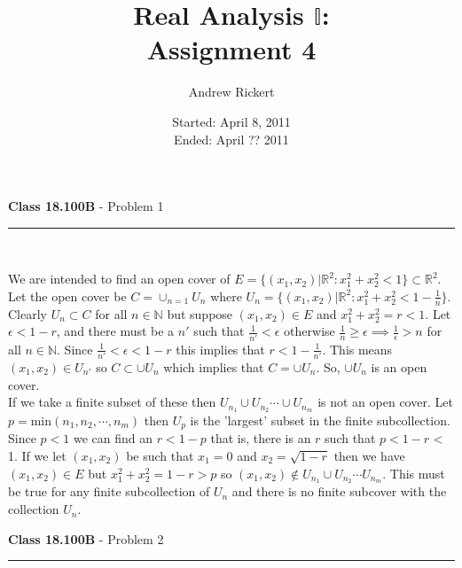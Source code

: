 \documentclass[11pt,reqno]{article}
\title{Real Analysis $\mathbb{I}$: \\ Assignment 4}
\author{Andrew Rickert}
\date{Started: April 8, 2011 \\ \hspace{1pt} Ended: April ??  2011}                                           %
\begin{document}
\maketitle


\begin{flushleft} 
\textbf{Class 18.100B} - Problem 1\\
\rule{500pt}{1pt}\\
\end{flushleft} 

We are intended to find an open cover of $E = \{(x_1,x_2) | \mathbb{R}^2 : x_1^2 + x_2^2 < 1\} \subset \mathbb{R}^2$. Let the open cover be $C = \cup_{n = 1} U_n$ where $U_n = \{ (x_1,x_2) | \mathbb{R}^2 : x_1^2 + x_2^2 < 1-\frac{1}{n} \}$. Clearly $U_n \subset C$ for all $n \in \mathbb{N}$ but suppose $(x_1,x_2) \in E$ and $ x_1^2 + x_2^2  = r < 1$. Let $\epsilon < 1 - r$, and there must be a $n'$ such that $\frac{1}{n'} < \epsilon$ otherwise $\frac{1}{n} \ge \epsilon \implies \frac{1}{\epsilon} > n$ for all $n \in \mathbb{N}$. Since $\frac{1}{n'} < \epsilon < 1 - r$ this implies that $r < 1 - \frac{1}{n'}$. This means $(x_1,x_2) \in U_{n'}$ so $C \subset \cup U_n$ which implies that $C = \cup U_n$. So, $\cup U_n$ is an open cover. \\
\indent If we take a finite subset of these then $U_{n_1} \cup U_{n_2} \cdots \cup U_{n_m}$ is not an open cover. Let $p = $min$(n_1,n_2,\cdots,n_m)$ then $U_p$ is the 'largest' subset in the finite subcollection. Since $p < 1$ we can find an $r < 1 - p$ that is, there is an $r$ such that $p < 1 - r$ < 1. If we let $(x_1,x_2)$ be such that $x_1 = 0$ and $x_2 = \sqrt{1-r}$ then we have $(x_1,x_2) \in E$ but $x_1^2 + x_2^2 = 1 - r > p$ so $(x_1,x_2) \notin U_{n_1} \cup U_{n_2} \cdots U_{n_m}$. This must be true for any finite subcollection of $U_n$ and there is no finite subcover with the collection $U_n$.

\vspace{15pt}
\begin{flushleft} 
\textbf{Class 18.100B} - Problem 2\\
\rule{500pt}{1pt}\\
\end{flushleft} 
\end{document}
